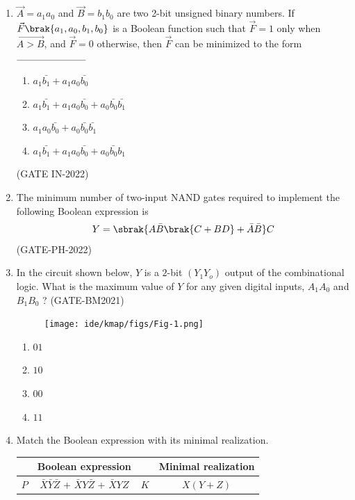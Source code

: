 \begin{enumerate}
\item $\vec{A}=a_1a_0$ and $\vec{B}=b_1b_0$ are two 2-bit unsigned binary numbers. If $\vec{F}\brak{a_1,a_0,b_1,b_0}$ is a Boolean function such that $\vec{F} = 1$ only when $\vec{A > B}$, and $\vec{F} = 0$ otherwise, then $\vec{F}$ can be minimized to the form $\rule{2.5cm}{0.10mm}$
\begin{enumerate}
\item $a_1\bar{b_1}+a_1a_0\bar{b_0}$
\item $a_1\bar{b_1}+a_1a_0\bar{b_0}+a_0\bar{b_0}\bar{b_1}$
\item $a_1a_0\bar{b_0}+a_0\bar{b_0}\bar{b_1}$
\item $a_1\bar{b_1}+a_1a_0\bar{b_0}+a_0\bar{b_0}b_1$
\end{enumerate}
\hfill(GATE IN-2022)

\item The minimum number of two-input NAND gates required to implement the following Boolean expression is \underline{\hspace{4cm}}
\begin{align*}
Y=\sbrak{A\bar{B}\brak{C+BD}+\bar{A}\bar{B}}C
\end{align*}
\hfill(GATE-PH-2022)

\item In the circuit shown below, $Y$ is a $2$-bit $(Y_1Y_o)$ output of the combinational logic. What is the 
maximum value of $Y$ for any given digital inputs, $A_1A_0$ and $B_1B_0$ ?
\hfill(GATE-BM2021)
\begin{figure}[H]
\centering
\texttt{[image: ide/kmap/figs/Fig-1.png]}
\caption{}
\label{fig:fig-1.png}
\end{figure}
\begin{enumerate}[label=(\Alph*)]
\item $01$
\item $10$
\item $00$
\item $11$
\end{enumerate}
\item Match the Boolean expression with its minimal realization.
	\begin{table}[ht]
		\centering
		\begin{tabular}{|c|c|c|c|}
\hline

   & Boolean expression &   &  Minimal realization \\
	\hline 

	$P$ & $\bar{X}\bar{Y}\bar{Z}$ + $\bar{X}Y\bar{Z}$ + $\bar{X}YZ$ & $K$ &  $X(Y+Z)$ \\


\end{tabular}
\end{table}
\end{enumerate}
